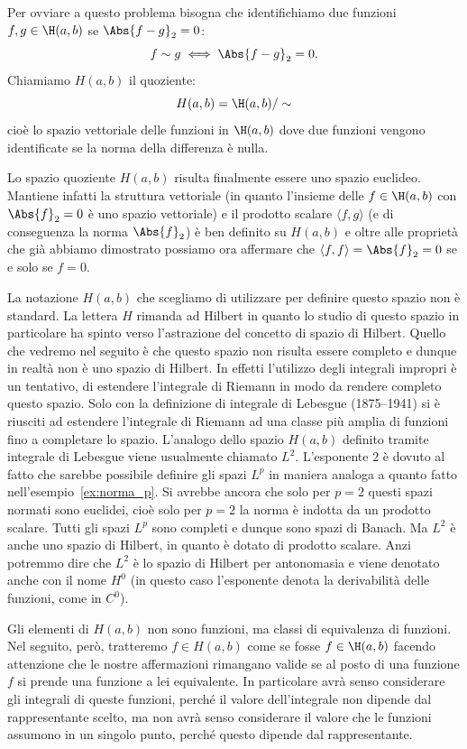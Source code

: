 Per ovviare a questo problema bisogna che identifichiamo due
funzioni $f,g\in \H(a,b)$ se $\Abs{f-g}_2=0$:
\[
  f \sim g  \iff \Abs{f-g}_2=0.
\]
Chiamiamo $H(a,b)$ il quoziente:
\[
  H(a,b) = \H(a,b)/\sim
\]
cioè lo spazio vettoriale delle funzioni in $\H(a,b)$ dove due funzioni
vengono identificate se la norma della differenza è nulla.

Lo spazio quoziente $H(a,b)$ risulta finalmente essere uno spazio
euclideo.
Mantiene infatti la struttura vettoriale (in quanto l'insieme
delle $f\in \H(a,b)$ con $\Abs{f}_2=0$
è uno spazio vettoriale)
e il prodotto scalare $\langle f,g\rangle$ (e di conseguenza la norma $\Abs{f}_2$)
è ben definito su $H(a,b)$ e oltre alle proprietà che già abbiamo dimostrato
possiamo ora affermare che $\langle f,f\rangle = \Abs{f}_2=0$ se e solo se $f=0$.

\begin{remark}
La notazione $H(a,b)$ che scegliamo di utilizzare per definire questo spazio
non è standard. La lettera $H$ rimanda ad Hilbert in quanto lo studio di questo
spazio in particolare ha spinto verso l'astrazione del concetto di spazio di Hilbert.
Quello che vedremo nel seguito è che questo spazio
non risulta essere completo e dunque in realtà non è uno spazio di Hilbert.
In effetti l'utilizzo degli integrali impropri è un tentativo, di
estendere l'integrale di Riemann in modo da rendere completo questo spazio.
Solo con la definizione di integrale di Lebesgue (1875--1941)
si è riusciti ad estendere l'integrale di Riemann
ad una classe più amplia di funzioni fino a completare lo spazio.
L'analogo dello spazio $H(a,b)$ definito tramite integrale di Lebesgue
viene
usualmente chiamato $L^2$. L'esponente $2$ è dovuto al fatto che
sarebbe possibile definire gli spazi $L^p$
in maniera analoga a quanto fatto nell'esempio~\ref{ex:norma_p}.
Si avrebbe ancora che solo per $p=2$ questi spazi normati sono euclidei,
cioè solo per $p=2$ la norma è indotta da un prodotto scalare.
Tutti gli spazi $L^p$ sono completi e dunque sono spazi di Banach.
Ma $L^2$ è anche uno spazio di Hilbert, in quanto è dotato di prodotto scalare.
Anzi potremmo dire che $L^2$ è lo spazio di Hilbert per antonomasia
e viene denotato anche con il nome $H^0$
(in questo caso l'esponente denota la derivabilità delle funzioni, come
in $C^0$).
\end{remark}

Gli elementi di $H(a,b)$ non sono funzioni, ma classi di equivalenza di funzioni.
Nel seguito, però, tratteremo $f\in H(a,b)$ come se fosse $f\in \H(a,b)$
facendo attenzione che le nostre affermazioni rimangano valide se al posto
di una funzione $f$ si prende una funzione a lei equivalente.
In particolare avrà senso considerare gli integrali di queste funzioni, perché il
valore dell'integrale non dipende dal rappresentante scelto, ma non avrà senso
considerare il valore che le funzioni assumono in un singolo punto, perché
questo dipende dal rappresentante.

